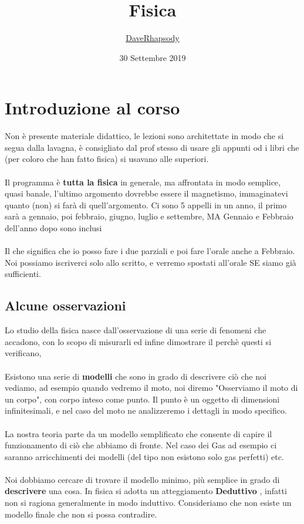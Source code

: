 \documentclass[12pt, a4paper, openany, oneside]{book}
\begin{document}
\pagestyle{headings}
\author{\href{https://github.com/daverhapsody}{DaveRhapsody}}
\title{Fisica}
\date{30 Settembre 2019}
\maketitle
\tableofcontents
\chapter{Introduzione al corso}
Non è presente materiale didattico, le lezioni sono architettate in modo che
si segua dalla lavagna, è consigliato dal prof stesso di usare gli appunti od i
libri che (per coloro che han fatto fisica) si usavano alle superiori.
\\ \\
Il programma è \textbf{tutta la fisica} in generale, ma affrontata in modo 
semplice, quasi banale, l'ultimo argomento dovrebbe essere il magnetismo, 
immaginatevi
quanto (non) si farà di quell'argomento. Ci sono 5 appelli in un anno, il primo
sarà a gennaio, poi febbraio, giugno, luglio e settembre, MA Gennaio e 
Febbraio dell'anno dopo sono inclusi
\\ \\
Il che significa che io posso fare i due parziali e poi fare l'orale anche a
Febbraio. Noi possiamo iscriverci solo allo scritto, e verremo spostati 
all'orale SE siamo già sufficienti. 
\section*{Alcune osservazioni}
Lo studio della fisica nasce dall'osservazione di una serie di fenomeni che 
accadono, con lo scopo di misurarli ed infine dimostrare il perchè questi
si verificano, 
\\ \\
Esistono una serie di \textbf{modelli} che sono in grado di descrivere ciò che
noi vediamo, ad esempio quando vedremo il moto, noi diremo "Osserviamo il moto
di un corpo", con corpo inteso come punto. Il punto è un oggetto di dimensioni
infinitesimali, e nel caso del moto ne analizzeremo i dettagli in modo 
specifico.
\\ \\
La nostra teoria parte da un modello semplificato che consente di capire il 
funzionamento di ciò che abbiamo di fronte. Nel caso dei Gas ad esempio ci 
saranno arricchimenti dei modelli (del tipo non esistono solo gas perfetti)
etc. \\ \\
Noi dobbiamo cercare di trovare il modello minimo, più semplice in grado di
\textbf{descrivere} una cosa. In fisica si adotta un atteggiamento \textbf{
Deduttivo}
, infatti non si ragiona generalmente in modo induttivo. Consideriamo che non 
esiste un modello finale che non si possa contradire.
\end{document}
